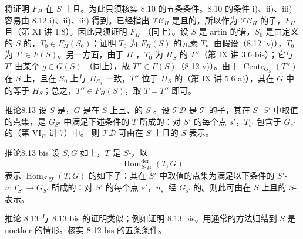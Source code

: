 将证明 $F_H$ 在 $S$ 上且。为此只须核实 8.10 的五条条件。8.10 的条件 i)、ii)、iii) 容易由 8.12 i)、ii)、iii) 得到。已经指出 $\mathcal{TC}_H$ 是且的，所以作为 $\mathcal{TC}_H$ 的子，$F_H$ 且（第 XI 讲 1.8）。因此只须证明 $F_H$ （同上）。设 $S$ 是 artin 的谱，$S_0$ 是由定义的 $S$ 的，$T_0\in F_H(S_0)$；证明 $T_0$ 为 $F_H(S)$ 的元素 $T$。由假设（8.12 iv)），$T_0$ 为 $T'\in F(S)$。另一方面，由于 $H$ ，$T_0$ 为 $H_S$ 的 $T''$（第 IX 讲 3.6 bis）；它与 $T'$ 由某个 $g\in G(S)$ （同上），故 $T''\in F(S)$（8.12 v)）。由于 $\operatorname{Centr}_{G_S}(T'')$ 在 $S$ 上，且在 $S_0$ 上与 $H_{S_0}$ 一致，$T''$ 位于 $H_S$ 的（第 IX 讲 5.6 a)），其在 $G$ 中的等于 $H_S$；总之，$T''\in F_H(S)$，取 $T=T''$ 即可。

\begin{SGAresult}{推论}{8.13}
设 $S$ 是，$G$ 是在 $S$ 上且、的 $S$-。设 $\mathcal{TD}$ 是 $\mathcal T$ 的子，其在 $S$- $S'$ 中取值的点集，是 $G_{S'}$ 中满足下述条件的 $T$ 所成的：对 $S'$ 的每个点 $s'$，$T_{s'}$ 包含于 $G_{s'}$ 的（第 VI$_B$ 讲 7）中。
则 $\mathcal{TD}$ 可由在 $S$ 上且的 $S$-表示。
\end{SGAresult}
\begin{SGAresult}{推论}{8.13 bis}
设 $S,G$ 如上，$T$ 是 $S$-，以
\[\operatorname{Hom}^{\mathrm{der}}_{S\text{-}\mathrm{gr}}(T,G)\]
表示 $\operatorname{Hom}_{S\text{-}\mathrm{gr}}(T,G)$ 的如下子：其在 $S'$ 中取值的点集为满足以下条件的 $S'$- $u:T_{S'}\to G_{S'}$ 所成的：对 $S'$ 的每个点 $s'$，$u_{s'}$ 经 $G_{s'}$ 的。则此可由在 $S$ 上且的 $S$-表示。
\end{SGAresult}
推论 8.13 与 8.13 bis 的证明类似；例如证明 8.13 bis。用通常的方法归结到 $S$ 是 noether 的情形。核实 8.12 bis 的五条条件。


